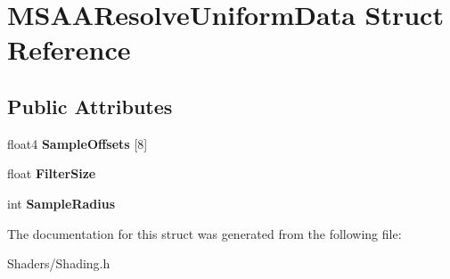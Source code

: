 \hypertarget{structMSAAResolveUniformData}{}\section{M\+S\+A\+A\+Resolve\+Uniform\+Data Struct Reference}
\label{structMSAAResolveUniformData}
\subsection*{Public Attributes}
\begin{DoxyCompactItemize}
\item 
\mbox{\label{structMSAAResolveUniformData_abbf3abc5af83e54d2d2a17c1fbf9d592}} 
float4 {\bfseries Sample\+Offsets} \mbox{[}8\mbox{]}
\item 
\mbox{\label{structMSAAResolveUniformData_a81c1eddeb390c9fd301d811b60c3765a}} 
float {\bfseries Filter\+Size}
\item 
\mbox{\label{structMSAAResolveUniformData_afc234d0851bb97d1a3cdf4295db3b3b9}} 
int {\bfseries Sample\+Radius}
\end{DoxyCompactItemize}


The documentation for this struct was generated from the following file\+:\begin{DoxyCompactItemize}
\item 
Shaders/Shading.\+h\end{DoxyCompactItemize}
